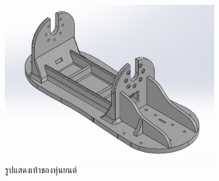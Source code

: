 \begin{figure}[h!]
  \centering
  \begin{subfigure}[b]{0.55\linewidth}
    \includegraphics[width=\linewidth]{chapter4/images/foot_old.PNG}
    \caption{รูปแสดงเท้าของหุ่นยนต์}
  \end{subfigure}
  \begin{subfigure}[b]{0.2\linewidth}

\end{subfigure}
\end{figure}
